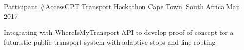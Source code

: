 \begin{cventries}
  \cventry
    {Participant} %
    {\#AccessCPT Transport Hackathon} %
    {Cape Town, South Africa} %
    {Mar. 2017} %
    {
      \begin{cvitems} %
        \item {Integrating with WhereIsMyTransport API to develop proof of concept for a futuristic public transport system with adaptive stops and line
routing}
      \end{cvitems}
    }

\end{cventries}
